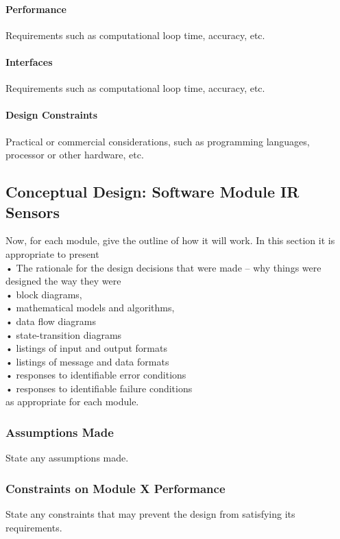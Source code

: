 \documentclass[MTRX3700report.tex]{subfiles}
\begin{document}
\paragraph{Performance}
Requirements such as computational loop time, accuracy, etc.
\paragraph{Interfaces}
Requirements such as computational loop time, accuracy, etc.
\paragraph{Design Constraints}
Practical or commercial considerations, such as programming languages, processor or other hardware, etc.

\subsection{Conceptual Design: Software Module IR Sensors}
Now, for each module, give the outline of how it will work. In this section it is appropriate to present \\
•	The rationale for the design decisions that were made – why things were designed the way they were\\
•	block diagrams,\\
•	mathematical models and algorithms,\\
•	data flow diagrams\\
•	state-transition diagrams\\
•	listings of input and output formats\\
•	listings of message and data formats\\
•	responses to identifiable error conditions\\
•	responses to identifiable failure conditions\\
as appropriate for each module.

\subsubsection{Assumptions Made}
State any assumptions made.
\subsubsection{Constraints on Module X Performance}
State any constraints that may prevent the design from satisfying its requirements.
\end{document}
